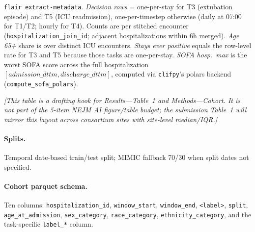 \documentclass[11pt]{article}
\newcommand{\note}[1]{{\color{notecolor}\textit{[#1]}}}
\begin{document}
\begin{table}[h]
{\texttt{flair extract-metadata}. \emph{Decision rows} = one-per-stay for
T3 (extubation episode) and T5 (ICU readmission), one-per-timestep
otherwise (daily at 07:00 for T1/T2; hourly for T4). Counts are per
stitched encounter (\texttt{hospitalization\_join\_id}; adjacent
hospitalizations within 6h merged). \emph{Age 65+} share is over distinct
ICU encounters. \emph{Stays ever positive} equals the row-level rate for
T3 and T5 because those tasks are one-per-stay. \emph{SOFA hosp.\ max} is the worst
SOFA score across the full hospitalization
$[\textit{admission\_dttm}, \textit{discharge\_dttm}]$, computed via
\texttt{clifpy}'s polars backend (\texttt{compute\_sofa\_polars}).}
\label{tab:mimic-snapshot}
\end{table}

\note{This table is a drafting hook for Results---Table~1
and Methods---Cohort. It is not part of the 5-item NEJM AI
figure/table budget; the submission Table~1 will mirror this layout
across consortium sites with site-level median/IQR.}

\paragraph{Splits.} Temporal date-based train/test split; MIMIC fallback
70/30 when split dates not specified.

\paragraph{Cohort parquet schema.} Ten columns:
\texttt{hospitalization\_id}, \texttt{window\_start}, \texttt{window\_end},
\texttt{<label>}, \texttt{split}, \texttt{age\_at\_admission},
\texttt{sex\_category}, \texttt{race\_category},
\texttt{ethnicity\_category}, and the task-specific \texttt{label\_*} column.
\end{document}
